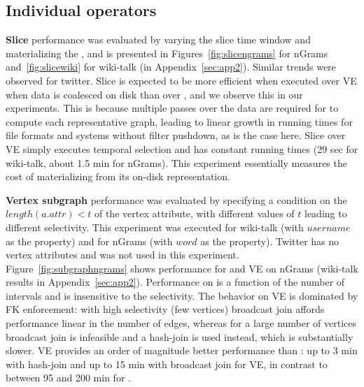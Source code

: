 
\subsection{Individual operators}
\label{sec:exp:ops}

{\bf Slice} performance was evaluated by varying the slice time window
and materializing the \tg, and is presented in
Figures~\ref{fig:slicengrams} for nGrams and~\ref{fig:slicewiki} for
wiki-talk (in Appendix~\ref{sec:app2}).  Similar trends were observed
for twitter.  Slice is expected to be more efficient when executed
over VE when data is coalesced on disk than over \sg, and we observe
this in our experiments.  This is because multiple passes over the
data are required for \sg to compute each representative graph,
leading to linear growth in running times for file formats and systems
without filter pushdown, as is the case here.  Slice over VE simply
executes temporal selection and has constant running times (29 sec for
wiki-talk, about 1.5 min for nGrams). This experiment essentially measures the cost of
materializing \sg from its on-disk representation. 

{\bf Vertex subgraph} performance was evaluated by specifying a
condition on the $length(a.attr)<t$ of the vertex attribute, with
different values of $t$ leading to different selectivity.  This
experiment was executed for wiki-talk (with $username$ as the
property) and for nGrams (with $word$ as the property).  Twitter has
no vertex attributes and was not used in this experiment.
Figure~\ref{fig:subgraphngrams} shows performance for \sg and VE on
nGrams (wiki-talk results in Appendix~\ref{sec:app2}).  Performance on
\sg is a function of the number of intervals and is insensitive to the
selectivity.  The behavior on VE is dominated by FK enforcement:
with high selectivity (few vertices) broadcast join affords
performance linear in the number of edges, whereas for a large number
of vertices broadcast join is infeasible and a hash-join is used
instead, which is substantially slower.  VE provides an order of
magnitude better performance than \sg: up to 3 min with hash-join and
up to 15 min with broadcast join for VE, in contrast to between 95 and
200 min for \sg.

